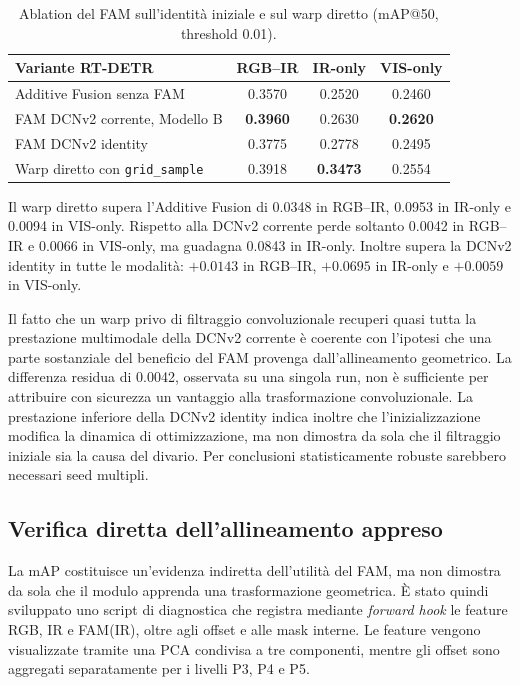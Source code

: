 \documentclass[a4paper,11pt]{article}
\begin{document}
\begin{table}[H]
\centering
\caption{Ablation del FAM sull'identità iniziale e sul warp diretto (mAP@50, threshold 0.01).}
\label{tab:rtdetr_fam_identity_ablation}
\begin{tabular}{lccc}
\toprule
\textbf{Variante RT-DETR} & \textbf{RGB--IR} & \textbf{IR-only} & \textbf{VIS-only} \\
\midrule
Additive Fusion senza FAM & 0.3570 & 0.2520 & 0.2460 \\
FAM DCNv2 corrente, Modello B & \textbf{0.3960} & 0.2630 & \textbf{0.2620} \\
FAM DCNv2 identity & 0.3775 & 0.2778 & 0.2495 \\
Warp diretto con \texttt{grid\_sample} & 0.3918 & \textbf{0.3473} & 0.2554 \\
\bottomrule
\end{tabular}
\end{table}

Il warp diretto supera l'Additive Fusion di 0.0348 in RGB--IR, 0.0953 in
IR-only e 0.0094 in VIS-only. Rispetto alla DCNv2 corrente perde soltanto
0.0042 in RGB--IR e 0.0066 in VIS-only, ma guadagna 0.0843 in IR-only.
Inoltre supera la DCNv2 identity in tutte le modalità: $+0.0143$ in RGB--IR,
$+0.0695$ in IR-only e $+0.0059$ in VIS-only.

Il fatto che un warp privo di filtraggio convoluzionale recuperi quasi tutta
la prestazione multimodale della DCNv2 corrente è coerente con l'ipotesi che
una parte sostanziale del beneficio del FAM provenga dall'allineamento
geometrico. La differenza residua di 0.0042, osservata su una singola run, non
è sufficiente per attribuire con sicurezza un vantaggio alla trasformazione
convoluzionale. La prestazione inferiore della DCNv2 identity indica inoltre
che l'inizializzazione modifica la dinamica di ottimizzazione, ma non dimostra
da sola che il filtraggio iniziale sia la causa del divario. Per conclusioni
statisticamente robuste sarebbero necessari seed multipli.

\subsection{Verifica diretta dell'allineamento appreso}

La mAP costituisce un'evidenza indiretta dell'utilità del FAM, ma non dimostra da sola che il modulo apprenda una trasformazione geometrica. È stato quindi sviluppato uno script di diagnostica che registra mediante \textit{forward hook} le feature RGB, IR e FAM(IR), oltre agli offset e alle mask interne. Le feature vengono visualizzate tramite una PCA condivisa a tre componenti, mentre gli offset sono aggregati separatamente per i livelli P3, P4 e P5.
\end{document}
